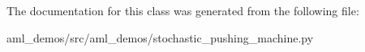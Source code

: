 The documentation for this class was generated from the following file\+:\begin{DoxyCompactItemize}
\item 
aml\+\_\+demos/src/aml\+\_\+demos/stochastic\+\_\+pushing\+\_\+machine.\+py\end{DoxyCompactItemize}
